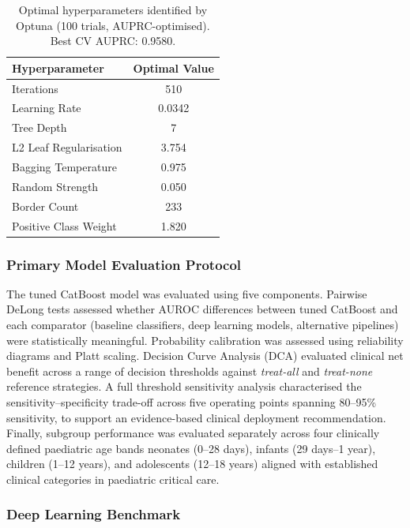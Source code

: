 \documentclass[final,3p,times]{elsarticle}
\begin{document}
\begin{table}[htbp]
\centering
\caption{Optimal hyperparameters identified by Optuna (100 trials,
AUPRC-optimised). Best CV AUPRC: 0.9580.}
\label{tab:catboost_hyperparams}
\begin{tabular}{lc}
\toprule
\textbf{Hyperparameter} & \textbf{Optimal Value} \\
\midrule
Iterations              & 510   \\
Learning Rate           & 0.0342 \\
Tree Depth              & 7     \\
L2 Leaf Regularisation  & 3.754 \\
Bagging Temperature     & 0.975 \\
Random Strength         & 0.050 \\
Border Count            & 233   \\
Positive Class Weight   & 1.820 \\
\bottomrule
\end{tabular}
\end{table}

\subsubsection{Primary Model Evaluation Protocol}
\label{subsec:eval_protocol}

The tuned CatBoost model was evaluated using five components.
Pairwise DeLong tests assessed whether AUROC differences between
tuned CatBoost and each comparator (baseline classifiers, deep
learning models, alternative pipelines) were statistically
meaningful. Probability calibration was assessed using reliability
diagrams and Platt scaling. Decision Curve Analysis (DCA) evaluated
clinical net benefit across a range of decision thresholds against
\textit{treat-all} and \textit{treat-none} reference strategies. A
full threshold sensitivity analysis characterised the
sensitivity--specificity trade-off across five operating points
spanning 80--95\% sensitivity, to support an evidence-based clinical
deployment recommendation. Finally, subgroup performance was
evaluated separately across four clinically defined paediatric age
bands  neonates (0--28 days), infants (29 days--1 year), children
(1--12 years), and adolescents (12--18 years)  aligned with
established clinical categories in paediatric critical care.

\subsubsection{Deep Learning Benchmark}
\label{subsec:dl_methods}
\end{document}
